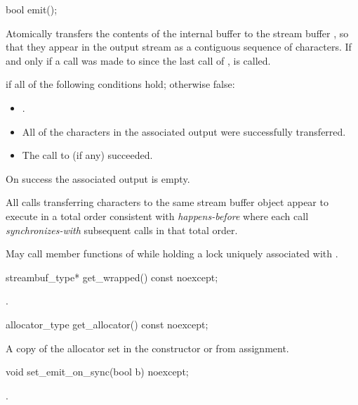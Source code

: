 \documentclass[ebook,11pt,article]{memoir}
\begin{document}

\begin{addedblock}
\begin{itemdecl}
bool emit();
\end{itemdecl}

\begin{itemdescr}
\pnum
\effects 
Atomically transfers the contents of the internal buffer to the stream buffer , so that they appear in the output stream as a contiguous sequence of characters. If and only if a call was made to  since the last call of ,   is called.

\pnum
\returns {} if all of the following conditions hold; otherwise false:
\begin{itemize}
\item {}.
\item All of the characters in the associated output were successfully transferred.
\item The call to  (if any) succeeded.
\end{itemize}

\pnum
\postconditions
On success the associated output is empty.

\pnum
{}
All  calls transferring characters to the same stream buffer object appear to execute in a total order consistent with \emph{happens-before} where each  call \emph{synchronizes-with} subsequent  calls in that total order.


\pnum
\remarks
May call member functions of  while holding a lock uniquely associated with .
\end{itemdescr}

\begin{itemdecl}
streambuf_type* get_wrapped() const noexcept;
\end{itemdecl}

\begin{itemdescr}
\pnum
\returns 
{}.
\end{itemdescr}

\begin{itemdecl}
allocator_type get_allocator() const noexcept;
\end{itemdecl}

\begin{itemdescr}
\pnum
\returns 
A copy of the allocator set in the constructor or from assignment.
\end{itemdescr}

\begin{itemdecl}
void set_emit_on_sync(bool b) noexcept;
\end{itemdecl}

\begin{itemdescr}
\pnum
\effects 
{}.
\end{itemdescr}

\end{addedblock}
\end{document}
